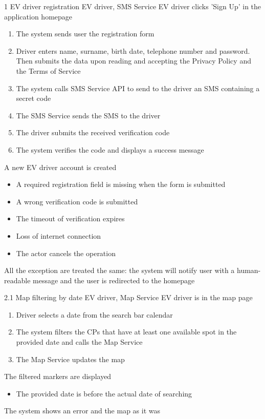 \usecase
{1}
{EV driver registration}
{EV driver, SMS Service}
{EV driver clicks 'Sign Up' in the application homepage}
{
    \begin{enumerate}
        \item The system sends user the registration form
        \item Driver enters name, surname, birth date, telephone number and password. Then submits the data upon reading and accepting the Privacy Policy and the Terms of Service
        \item The system calls SMS Service API to send to the driver an SMS containing a secret code
        \item The SMS Service sends the SMS to the driver
        \item The driver submits the received verification code
        \item The system verifies the code and displays a success message
    \end{enumerate}
}
{A new EV driver account is created}
{
    \begin{itemize}
        \item A required registration field is missing when the form is submitted
        \item A wrong verification code is submitted
        \item The timeout of verification expires
        \item Loss of internet connection
        \item The actor cancels the operation
    \end{itemize}
}
{
    All the exception are treated the same: the system will notify user with a human-readable message and the user is redirected to the homepage
}


\usecase
{2.1}
{Map filtering by date}
{EV driver, Map Service}
{EV driver is in the map page}
{
    \begin{enumerate}
        \item Driver selects a date from the search bar calendar
        \item The system filters the CPs that have at least one available spot in the provided date and calls the Map Service
        \item The Map Service updates the map
    \end{enumerate}
}
{The filtered markers are displayed}
{
    \begin{itemize}
        \item The provided date is before the actual date of searching
    \end{itemize}
}
{
    The system shows an error and the map as it was
}

